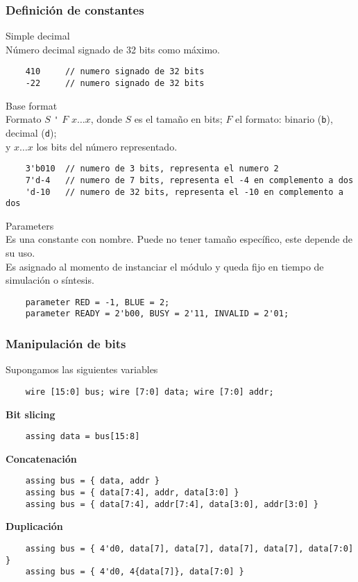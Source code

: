 \documentclass[aspectratio=169]{beamer}
\begin{document}
\begin{frame}[fragile]
    \frametitle{Definición de constantes}
    \normalsize \textcolor{naranjauca}{Simple decimal}\\ \small
    Número decimal signado de 32 bits como máximo.
\begin{lstlisting}
    410     // numero signado de 32 bits
    -22     // numero signado de 32 bits
\end{lstlisting}
    \pause
    \normalsize \textcolor{naranjauca}{Base format}\\ \small
    Formato \textcolor{azulC}{$S$} \verb|'| \textcolor{rojo}{$F$} \textcolor{amarillo}{$x \dots x$}, donde \textcolor{azulC}{$S$} es el tamaño en bits;
    \textcolor{rojo}{$F$} el formato: binario (\texttt{b}), decimal (\texttt{d});\\ %
    y \textcolor{amarillo}{$x \dots x$} los bits del número representado.
\begin{lstlisting}
    3'b010  // numero de 3 bits, representa el numero 2
    7'd-4   // numero de 7 bits, representa el -4 en complemento a dos
    'd-10   // numero de 32 bits, representa el -10 en complemento a dos
\end{lstlisting}
    \pause
    \normalsize \textcolor{naranjauca}{Parameters}\\ \small
    Es una constante con nombre. Puede no tener tamaño específico, este depende de su uso.\\
    Es asignado al momento de instanciar el módulo y queda fijo en tiempo de simulación o síntesis.
\begin{lstlisting}
    parameter RED = -1, BLUE = 2;
    parameter READY = 2'b00, BUSY = 2'11, INVALID = 2'01;
\end{lstlisting}
\end{frame}

\begin{frame}[fragile,t]
    \frametitle{Manipulación de bits}
    Supongamos las siguientes variables
\begin{lstlisting}
    wire [15:0] bus; wire [7:0] data; wire [7:0] addr;
\end{lstlisting}
    \bigskip
    \pause
    \textcolor{naranjauca}{\textbf{Bit slicing}}
\begin{lstlisting}
    assing data = bus[15:8]
\end{lstlisting}
    \pause
    \textcolor{naranjauca}{\textbf{Concatenación}}
\begin{lstlisting}
    assing bus = { data, addr }
    assing bus = { data[7:4], addr, data[3:0] }
    assing bus = { data[7:4], addr[7:4], data[3:0], addr[3:0] }
\end{lstlisting}
    \pause
    \textcolor{naranjauca}{\textbf{Duplicación}}
\begin{lstlisting}
    assing bus = { 4'd0, data[7], data[7], data[7], data[7], data[7:0] }
    assing bus = { 4'd0, 4{data[7]}, data[7:0] }
\end{lstlisting}
\end{frame}
\end{document}
